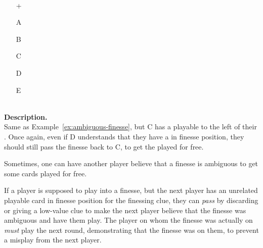 \begin{example}	\hfill \\
	\label{ex:layered-ambiguous-finesse}
	\begin{minipage}{0.45\textwidth}
		\begin{itemize}
			\item[\Large +]      
			\item[\Large A]    
			\item[\Large B]    
			\item[\Large C]     
			\item[\Large D]    
			\item[\Large E]    
		\end{itemize}
	\end{minipage}%
	\begin{minipage}{0.55\textwidth}
		\hfill \\
		
		\textbf{Description.} \\
		
		Same as Example~\ref{ex:ambiguous-finesse}, but C has a playable  to the left of their . Once again, even if D understands that they have a  in finesse position, they should still pass the finesse back to C, to get the  played for free.
	\end{minipage}
\end{example} \vspace{0.15 cm}

Sometimes, one can have another player believe that a finesse is ambiguous to get some cards played for free.

\begin{convention}
	If a player is supposed to play into a finesse, but the next player has an unrelated playable card in finesse position for the finessing clue, they can \emph{pass} by discarding or giving a low-value clue to make the next player believe that the finesse was ambiguous and have them play. The player on whom the finesse was actually on \emph{must} play the next round, demonstrating that the finesse was on them, to prevent a misplay from the next player.
\end{convention}

